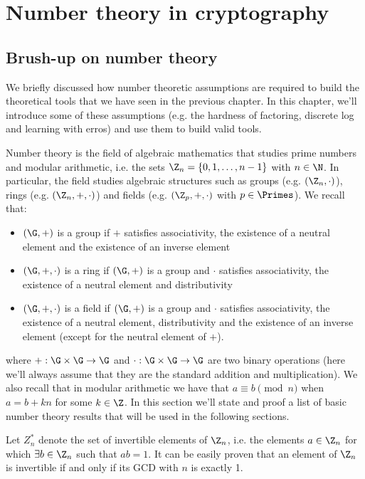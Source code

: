 \documentclass[a4paper, 12pt]{report}
\begin{document}
    \chapter{Number theory in cryptography}

    \section{Brush-up on number theory}

    We briefly discussed how number theoretic assumptions are required to build the theoretical tools that we have seen in the previous chapter. In this chapter, we'll introduce some of these assumptions (e.g. the hardness of factoring, discrete log and learning with erros) and use them to build valid tools.

    Number theory is the field of algebraic mathematics that studies prime numbers and modular arithmetic, i.e. the sets $\Z_n = \{0, 1, \ldots, n-1\}$ with $n \in \N$. In particular, the field studies algebraic structures such as groups (e.g. $(\Z_n, \cdot)$), rings (e.g. $(\Z_n, +, \cdot)$) and fields (e.g. $(\Z_p, +, \cdot)$ with $p \in \Primes$). We recall that:
    \begin{itemize}
        \item $(\G, +)$ is a group if $+$ satisfies associativity, the existence of a neutral element and the existence of an inverse element 
        \item $(\G, +, \cdot)$ is a ring if $(\G, +)$ is a group and $\cdot$ satisfies associativity, the existence of a neutral element and distributivity
        \item $(\G, +, \cdot)$ is a field if $(\G, +)$ is a group and $\cdot$ satisfies associativity, the existence of a neutral element, distributivity and the existence of an inverse element (except for the neutral element of $+$).
    \end{itemize}
    where $+ : \G \times \G \to \G$ and $\cdot : \G \times \G \to \G$ are two binary operations (here we'll always assume that they are the standard addition and multiplication). We also recall that in modular arithmetic we have that $a \equiv b \pmod n$ when $a = b+kn$ for some $k \in \Z$. In this section we'll state and proof a list of basic number theory results that will be used in the following sections.

    Let $Z_n^*$ denote the set of invertible elements of $\Z_n$, i.e. the elements $a \in \Z_n$ for which $\exists b \in \Z_n$ such that $ab = 1$. It can be easily proven that an element of $\Z_n$ is invertible if and only if its GCD with $n$ is exactly 1.
\end{document}
